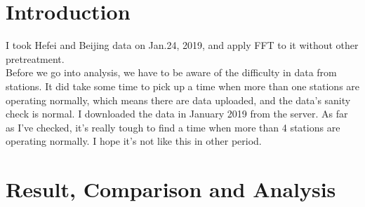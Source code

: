 \documentclass[
11pt, %
a4paper %
]{article}%
\title{\normalfont{\huge Short Report on FFT in Hefei and Beijing Data}} %
\author{Yuzhe Zhang} %
\theoremstyle{plain}
\begin{document}
\maketitle %


\newpage





\section{Introduction}
I took Hefei and Beijing data on Jan.24, 2019, and apply FFT to it without other pretreatment. \\
Before we go into analysis, we have to be aware of the difficulty in data from stations. It did take some time to pick up a time when more than one stations are operating normally, which means there are data uploaded, and the data's sanity check is normal. I downloaded the data in January 2019 from the server. As far as I've checked, it's really tough to find a time when more than 4 stations are operating normally. I hope it's not like this in other period. 
\section{Result, Comparison and Analysis}
\end{document}
